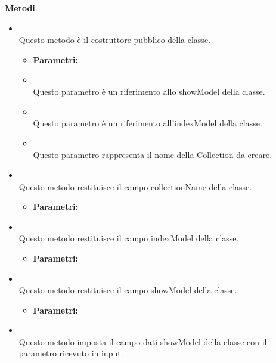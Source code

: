 \textbf{Metodi}
\begin{itemize}
\item[] \textbf{} \\ Questo metodo è il costruttore pubblico della classe.
\begin{itemize}\addtolength{\itemsep}{-0.5\baselineskip}
\item[] \textbf{Parametri:}
\item[]  \\ Questo parametro è un riferimento allo showModel della classe.
\item[]  \\ Questo parametro è un riferimento all'indexModel della classe.
\item[]  \\ Questo parametro rappresenta il nome della Collection da creare.
\end{itemize}
\item[] \textbf{} \\ Questo metodo restituisce il campo collectionName della classe.
\begin{itemize}\addtolength{\itemsep}{-0.5\baselineskip}
\item[] \textbf{Parametri:}
\end{itemize}
\item[] \textbf{} \\ Questo metodo restituisce il campo indexModel della classe.
\begin{itemize}\addtolength{\itemsep}{-0.5\baselineskip}
\item[] \textbf{Parametri:}
\end{itemize}
\item[] \textbf{} \\ Questo metodo restituisce il campo showModel della classe.
\begin{itemize}\addtolength{\itemsep}{-0.5\baselineskip}
\item[] \textbf{Parametri:}
\end{itemize}
\item[] \textbf{} \\ Questo metodo imposta il campo dati showModel della classe con il parametro ricevuto in input.
\begin{itemize}\addtolength{\itemsep}{-0.5\baselineskip}

\end{itemize}
\end{itemize}
